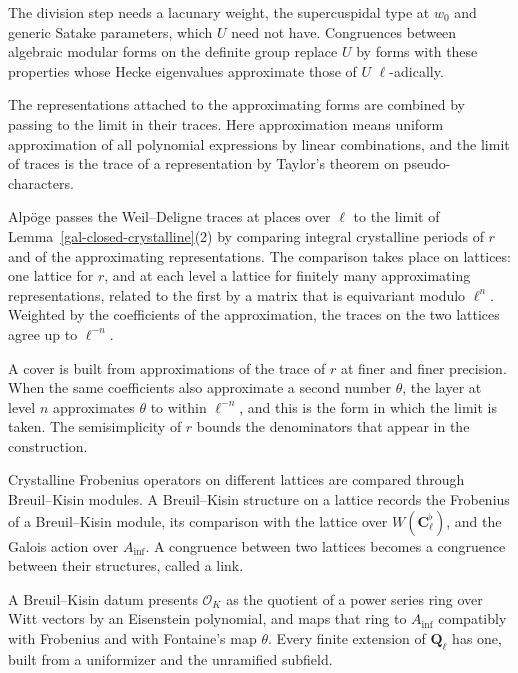 The division step needs a lacunary weight, the supercuspidal type at $w_0$ and generic Satake
parameters, which $U$ need not have. Congruences between algebraic modular forms on the definite group
replace $U$ by forms with these properties whose Hecke eigenvalues approximate those of $U$
$\ell$-adically.

The representations attached to the approximating forms are combined by passing to the limit in their
traces. Here approximation means uniform approximation of all polynomial expressions by linear
combinations, and the limit of traces is the trace of a representation by Taylor's theorem on
pseudo-characters.

Alpöge passes the Weil--Deligne traces at places over $\ell$ to the limit of
Lemma~\ref{gal-closed-crystalline}(2) by comparing integral crystalline periods of $r$ and of the
approximating representations. The comparison takes place on lattices: one lattice for $r$, and at
each level a lattice for finitely many approximating representations, related to the first by a matrix
that is equivariant modulo $\ell^n$. Weighted by the coefficients of the approximation, the traces on
the two lattices agree up to $\ell^{-n}$.

A cover is built from approximations of the trace of $r$ at finer and finer precision. When the same
coefficients also approximate a second number $\theta$, the layer at level $n$ approximates $\theta$
to within $\ell^{-n}$, and this is the form in which the limit is taken. The semisimplicity of $r$
bounds the denominators that appear in the construction.

Crystalline Frobenius operators on different lattices are compared through Breuil--Kisin modules. A
Breuil--Kisin structure on a lattice records the Frobenius of a Breuil--Kisin module, its comparison
with the lattice over $W(\mathbf C_\ell^\flat)$, and the Galois action over $A_{\inf}$. A congruence
between two lattices becomes a congruence between their structures, called a link.

A Breuil--Kisin datum presents $\mathcal O_K$ as the quotient of a power series ring over Witt vectors by
an Eisenstein polynomial, and maps that ring to $A_{\inf}$ compatibly with Frobenius and with Fontaine's map
$\theta$. Every finite extension of $\mathbf Q_\ell$ has one, built from a uniformizer and the unramified
subfield.

